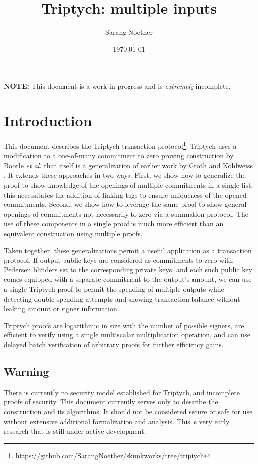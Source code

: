 \documentclass[draft]{article}
\title{Triptych: multiple inputs}
\author{Sarang Noether}
\date{\today}
\begin{document}
\maketitle

\textbf{NOTE:} This document is a work in progress and is \textit{extremely} incomplete.


\section{Introduction}
This document describes the Triptych transaction protocol\footnote{\url{https://github.com/SarangNoether/skunkworks/tree/triptych}}.
Triptych uses a modification to a one-of-many commitment to zero proving construction by Bootle \textit{et al.} \cite{bootle} that itself is a generalization of earlier work by Groth and Kohlweiss \cite{groth}.
It extends these approaches in two ways.
First, we show how to generalize the proof to show knowledge of the openings of multiple commitments in a single list; this necessitates the addition of linking tags to ensure uniqueness of the opened commitments.
Second, we show how to leverage the same proof to show general openings of commitments not necessarily to zero via a summation protocol.
The use of these components in a single proof is much more efficient than an equivalent construction using multiple proofs.

Taken together, these generalizations permit a useful application as a transaction protocol.
If output public keys are considered as commitments to zero with Pedersen blinders set to the corresponding private keys, and each such public key comes equipped with a separate commitment to the output's amount, we can use a single Triptych proof to permit the spending of multiple outputs while detecting double-spending attempts and showing transaction balance without leaking amount or signer information.

Triptych proofs are logarithmic in size with the number of possible signers, are efficient to verify using a single multiscalar multiplication operation, and can use delayed batch verification of arbitrary proofs for further efficiency gains.

\subsection{Warning}
There is currently no security model established for Triptych, and incomplete proofs of security.
This document currently serves only to describe the construction and its algorithms.
It should not be considered secure or safe for use without extensive additional formalization and analysis.
This is very early research that is still under active development.
\end{document}
